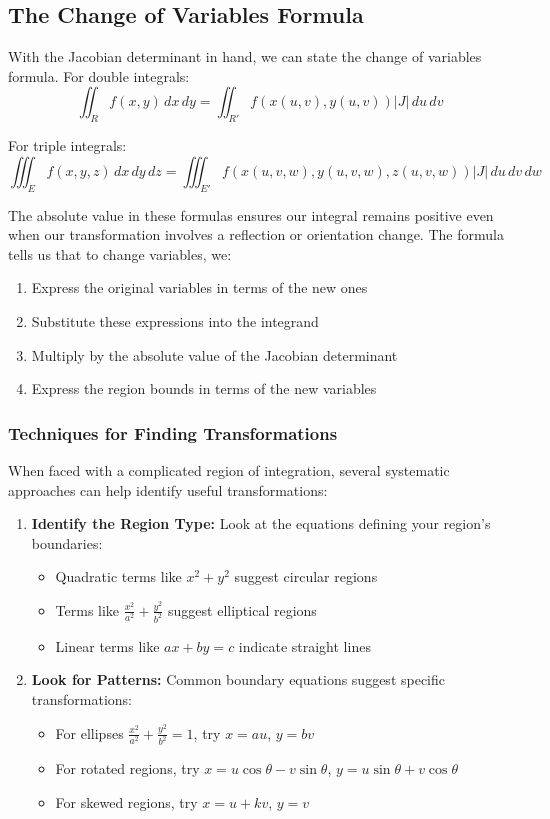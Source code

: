 \subsection*{The Change of Variables Formula}

\noindent With the Jacobian determinant in hand, we can state the change of variables formula. For double integrals:
\[
\iint_R f(x,y)\,dx\,dy = \iint_{R'} f(x(u,v),y(u,v))|J|\,du\,dv
\]

\noindent For triple integrals:
\[
\iiint_E f(x,y,z)\,dx\,dy\,dz = \iiint_{E'} f(x(u,v,w),y(u,v,w),z(u,v,w))|J|\,du\,dv\,dw
\]

\noindent The absolute value in these formulas ensures our integral remains positive even when our transformation involves a reflection or orientation change. The formula tells us that to change variables, we:
\begin{enumerate}
    \item Express the original variables in terms of the new ones
    \item Substitute these expressions into the integrand
    \item Multiply by the absolute value of the Jacobian determinant
    \item Express the region bounds in terms of the new variables
\end{enumerate}

\subsubsection*{Techniques for Finding Transformations}

\noindent When faced with a complicated region of integration, several systematic approaches can help identify useful transformations:

\begin{enumerate}
    \item \textbf{Identify the Region Type:} Look at the equations defining your region's boundaries:
    \begin{itemize}
        \item Quadratic terms like $x^2 + y^2$ suggest circular regions
        \item Terms like $\frac{x^2}{a^2} + \frac{y^2}{b^2}$ suggest elliptical regions
        \item Linear terms like $ax + by = c$ indicate straight lines
    \end{itemize}

    \item \textbf{Look for Patterns:} Common boundary equations suggest specific transformations:
    \begin{itemize}
        \item For ellipses $\frac{x^2}{a^2} + \frac{y^2}{b^2} = 1$, try $x = au$, $y = bv$
        \item For rotated regions, try $x = u\cos\theta - v\sin\theta$, $y = u\sin\theta + v\cos\theta$
        \item For skewed regions, try $x = u + kv$, $y = v$
    \end{itemize}
\end{enumerate}

